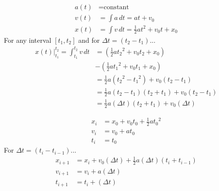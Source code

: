 \documentclass[10pt]{article}%
\begin{document}
\setlength{\baselineskip}{1.2\baselineskip}%
\begin{multicols*}{2}

\begin{align}
 a(t) &= \text{constant} \\
 v(t) &= \int a \, dt =  \boxed{at  + v_{0}} \\
 x(t) &= \int v \, dt = \boxed{\frac{1}{2}at^{2} + v_{0}t + x_{0}}
\end{align}
For any interval $\left[ t_{1}, t_{2} \right]$ and for $\Delta t = \left( {t_{2}} - {t_{1}} \right)$...
\begin{align}
 x(t)\bigg\rvert_{t_{1}}^{t_{2}} = \int_{t_{1}}^{t_{2}} v \, dt &= \left( \frac{1}{2}a{t_{2}}^{2} + v_{0}{t_{2}} + x_{0} \right) \\ &- \left( \frac{1}{2}a{t_{1}}^{2} + v_{0}{t_{1}} + x_{0} \right) \\
  &= \frac{1}{2}a\left( {t_{2}}^{2} - {t_{1}}^{2} \right) + v_{0}\left( {t_{2}} - {t_{1}} \right) \\
  &= \frac{1}{2}a\left( {t_{2}} - {t_{1}} \right)\left( {t_{2}} + {t_{1}} \right) + v_{0}\left( {t_{2}} - {t_{1}} \right) \\
  &= \boxed{\frac{1}{2}a\left( \Delta t \right)\left( {t_{2}} + {t_{1}} \right) + v_{0}\left( \Delta t \right)}
\end{align}

\divider


\begin{align}
x_{i} &= x_{0} + v_{0} t_{0} + \frac{1}{2} a {t_{0}}^{2} \\
v_{i} &= v_{0} + a t_{0} \\
t_{i} &= t_{0}
\end{align}
For $\Delta t = \left( {t_{i}} - {t_{i - 1}} \right)$...
\begin{align}
x_{i + 1} &= x_{i} + v_{0} \left( \Delta t \right) + \frac{1}{2} a \left( \Delta t \right) \left( t_{i} + t_{i - 1} \right) \label{x-i1} \\
v_{i + 1} &= v_{i} + a \left( \Delta t \right) \\
t_{i + 1} &= t_{i} + \left( \Delta t \right)
\end{align}


\end{multicols*}
\end{document}
